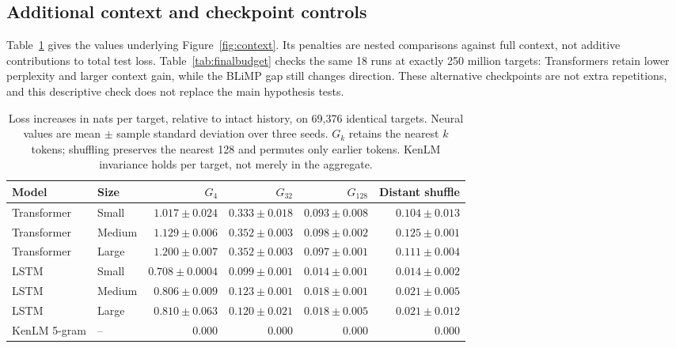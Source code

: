 \documentclass[10pt]{article}
\begin{document}
\subsection{Additional context and checkpoint controls}

Table~\ref{tab:interventions} gives the values underlying Figure~\ref{fig:context}. Its penalties are nested comparisons against full context, not additive contributions to total test loss. Table~\ref{tab:finalbudget} checks the same 18 runs at exactly 250 million targets: Transformers retain lower perplexity and larger context gain, while the BLiMP gap still changes direction. These alternative checkpoints are not extra repetitions, and this descriptive check does not replace the main hypothesis tests.

\begin{table}[ht]
\centering
\small
\begin{tabular}{llrrrr}
\toprule
Model & Size & $G_4$ & $G_{32}$ & $G_{128}$ & Distant shuffle \\
\midrule
Transformer & Small & $1.017\pm0.024$ & $0.333\pm0.018$ & $0.093\pm0.008$ & $0.104\pm0.013$ \\
Transformer & Medium & $1.129\pm0.006$ & $0.352\pm0.003$ & $0.098\pm0.002$ & $0.125\pm0.001$ \\
Transformer & Large & $1.200\pm0.007$ & $0.352\pm0.003$ & $0.097\pm0.001$ & $0.111\pm0.004$ \\
LSTM & Small & $0.708\pm0.0004$ & $0.099\pm0.001$ & $0.014\pm0.001$ & $0.014\pm0.002$ \\
LSTM & Medium & $0.806\pm0.009$ & $0.123\pm0.001$ & $0.018\pm0.001$ & $0.021\pm0.005$ \\
LSTM & Large & $0.810\pm0.063$ & $0.120\pm0.021$ & $0.018\pm0.005$ & $0.021\pm0.012$ \\
KenLM 5-gram & -- & 0.000 & 0.000 & 0.000 & 0.000 \\
\bottomrule
\end{tabular}
\caption{Loss increases in nats per target, relative to intact history, on 69,376 identical targets. Neural values are mean $\pm$ sample standard deviation over three seeds. $G_k$ retains the nearest $k$ tokens; shuffling preserves the nearest 128 and permutes only earlier tokens. KenLM invariance holds per target, not merely in the aggregate.}
\label{tab:interventions}
\end{table}
\end{document}
